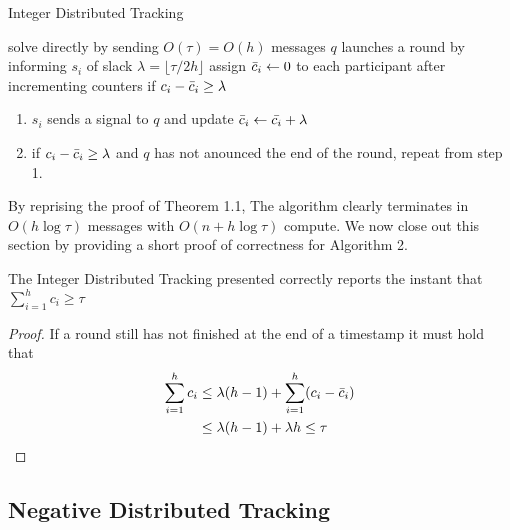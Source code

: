 \begin{algorithm}
\caption{Integer Distributed Tracking }\label{Algorithm 3}
\begin{algorithmic}
        \State solve directly by sending $O(\tau) = O(h)$ messages
        \State $q$ launches a round by informing $s_i$ of slack $\lambda = \lfloor \tau/2h \rfloor$
        \State assign $\Bar{c}_i \gets 0$ to each participant
        \State after incrementing counters if $c_i - \Bar{c}_i \geq \lambda$
        \begin{enumerate}
            \item $s_i$ sends a signal to $q$ and update $\Bar{c}_i \gets \Bar{c_i} + \lambda$
            \item if $c_i - \Bar{c}_i \geq \lambda$ and $q$ has not anounced the end of the round, repeat from step 1.
        \end{enumerate}
    \EndIf
\end{algorithmic}
\end{algorithm}
By reprising the proof of Theorem 1.1, The algorithm clearly terminates in $O(h\log\tau)$ messages with $O(n + h\log\tau)$ compute. We now close out this section by providing a short proof of correctness for Algorithm 2. 
\begin{theorem}[Correctness] The Integer Distributed Tracking presented correctly reports the instant that $\sum_{i=1}^{h}c_i \geq \tau$
\end{theorem}
\begin{proof}
    If a round still has not finished at the end of a timestamp it must hold that 
    \begin{align*}
        \sum_{i=1}^{h}c_i &\leq \lambda (h-1) + \sum_{i=1}^{h}(c_i - \Bar{c}_i) \\
        &\leq \lambda(h-1) + \lambda h \leq \tau
    \end{align*}
\end{proof}

\subsection{Negative Distributed Tracking}